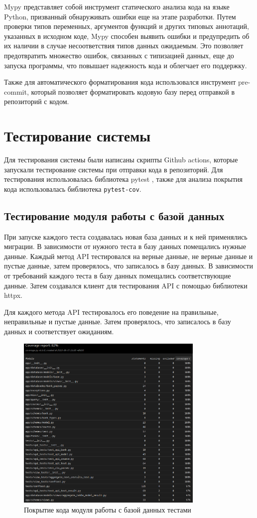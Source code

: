 \documentclass[PI, VKR]{HSEUniversity}
\begin{document}
Mypy представляет собой инструмент статического анализа кода на языке Python, призванный обнаруживать ошибки еще на этапе разработки. Путем проверки типов переменных, аргументов функций и других типовых аннотаций, указанных в исходном коде, Mypy способен выявить ошибки и предупредить об их наличии в случае несоответствия типов данных ожидаемым. Это позволяет предотвратить множество ошибок, связанных с типизацией данных, еще до запуска программы, что повышает надежность кода и облегчает его поддержку.

Также для автоматического форматирования кода использовался инструмент pre-commit, который позволяет форматировать кодовую базу перед отправкой в репозиторий с кодом.
\section{Тестирование системы}
\label{sec:org8d526c9}
Для тестирования системы были написаны скрипты Github actions, которые запускали тестирование системы при отправки кода в репозиторий. Для тестирования использовалась библиотека pytest \autocite{krekel_pytest_2004}, также для анализа покрытия кода использовалась библиотека \texttt{pytest-cov}.
\subsection{Тестирование модуля работы с базой данных}
\label{sec:org35d93be}
При запуске каждого теста создавалась новая база данных и к ней применялись миграции. В зависимости от нужного теста в базу данных помещались нужные данные. Каждый метод API тестировался на верные данные, не верные данные и пустые данные, затем проверялось, что записалось в базу данных. В зависимости от требований каждого теста в базу данных помещались соответствующие данные. Затем создавался клиент для тестирования API с помощью библиотеки httpx.

Для каждого метода API тестировалось его поведение на правильные, неправильные и пустые данные. Затем проверялось, что записалось в базу данных и соответствует ожиданиям.

\begin{figure}[h]
\centering
\includegraphics[width=0.8\textwidth]{img/api_coverage.png}
\caption{\label{fig:api_coverage}Покрытие кода модуля работы с базой данных тестами}
\end{figure}
\end{document}
